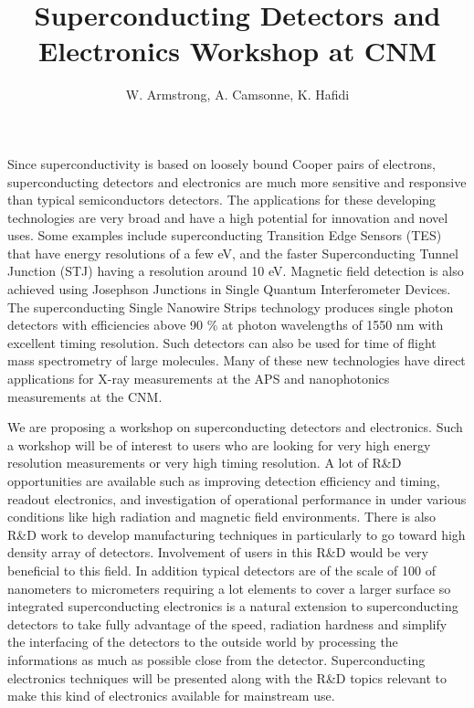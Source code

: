 \documentclass{article}
\title{Superconducting Detectors and Electronics Workshop at CNM}
\author{W. Armstrong, A. Camsonne, K. Hafidi}
\begin{document}
\maketitle

Since superconductivity is based on loosely bound Cooper pairs of electrons, 
superconducting detectors and electronics are much more sensitive and 
responsive than typical semiconductors detectors. The applications for these 
developing technologies are very broad and have a high potential for 
innovation and novel uses. Some examples include superconducting Transition Edge 
Sensors (TES) that have energy resolutions of a few eV, and the faster 
Superconducting Tunnel Junction (STJ) having a resolution around 10 eV. 
Magnetic field detection is also achieved using Josephson Junctions in Single 
Quantum Interferometer Devices. The superconducting Single Nanowire Strips 
technology produces single photon detectors with efficiencies above 90 \% at 
photon wavelengths of 1550 nm with excellent timing resolution.  Such detectors 
can also be used for time of flight mass spectrometry of large molecules.  Many 
of these new technologies have direct applications for X-ray measurements at 
the APS and nanophotonics measurements at the CNM.

We are proposing a workshop on superconducting detectors and electronics.
Such a workshop will be of interest to users who are looking for very high 
energy resolution measurements or very high timing resolution. A lot of R\&D 
opportunities are available such as improving detection efficiency and timing, 
readout electronics, and investigation of operational performance in under 
various conditions like high radiation and magnetic field environments.
There is also R\&D work to develop manufacturing techniques in particularly to 
go toward high density array of detectors. Involvement of users in this R\&D 
would be very beneficial to this field. In addition typical detectors are 
of the scale of 100 of nanometers to micrometers requiring a lot elements to 
cover a larger surface so integrated superconducting electronics is a natural extension to superconducting detectors to take fully advantage of the speed, radiation hardness and simplify the interfacing of the detectors to the outside world by processing the informations as much as possible close from the detector. Superconducting electronics techniques will be presented along with the R\&D topics relevant to make this kind of electronics available for mainstream use.
\end{document}
